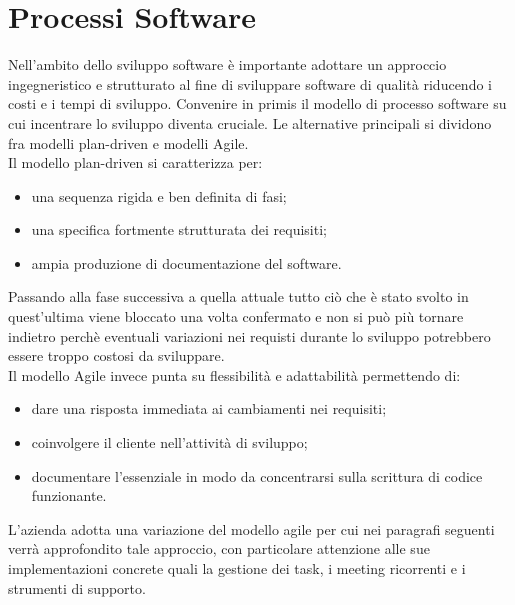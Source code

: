 \documentclass[target=bach,aauheader=,style=]{thud}
\begin{document}
\section{Processi Software}
Nell'ambito dello sviluppo software è importante adottare un approccio ingegneristico e strutturato al fine di sviluppare software di
qualità riducendo i costi e i tempi di sviluppo. Convenire in primis il modello di processo software su cui incentrare lo
sviluppo diventa cruciale. Le alternative principali si dividono fra modelli plan-driven e modelli Agile.\\
Il modello plan-driven si caratterizza per:
\begin{itemize}
    \item una sequenza rigida e ben definita di fasi;
    \item una specifica fortmente strutturata dei requisiti;
    \item ampia produzione di documentazione del software.
\end{itemize}
Passando alla fase successiva a quella attuale tutto ciò che è stato svolto in quest'ultima viene bloccato una volta confermato
e non si può più tornare indietro perchè eventuali variazioni nei requisti durante lo sviluppo potrebbero essere troppo costosi
da sviluppare.\\ Il modello Agile invece punta su flessibilità e adattabilità permettendo di:
\begin{itemize}
    \item dare una risposta immediata ai cambiamenti nei requisiti;
    \item coinvolgere il cliente nell'attività di sviluppo;
    \item documentare l'essenziale in modo da concentrarsi sulla scrittura di codice funzionante.
\end{itemize}
L'azienda adotta una variazione del modello agile per cui nei paragrafi seguenti verrà approfondito tale approccio,
con particolare attenzione alle sue implementazioni concrete quali la gestione dei task, i meeting ricorrenti e i strumenti
di supporto.
\end{document}

